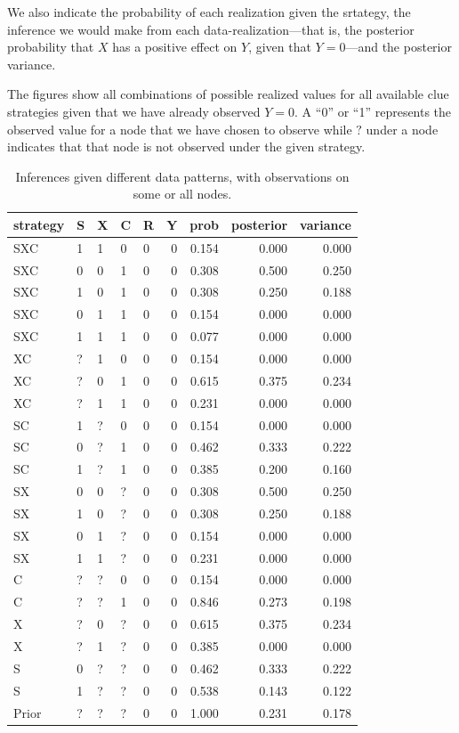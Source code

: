 \documentclass[
  12pt,
]{book}
\begin{document}
We also indicate the probability of each realization given the srtategy, the inference we would make from each data-realization---that is, the posterior probability that \(X\) has a positive effect on \(Y\), given that \(Y=0\)---and the posterior variance.

The figures show all combinations of possible realized values for all available clue strategies given that we have already observed \(Y=0\). A ``0'' or ``1'' represents the observed value for a node that we have chosen to observe while \(?\) under a node indicates that that node is not observed under the given strategy.

\begin{table}

\caption{\label{tab:showstrats5xx}Inferences given different data patterns, with observations on some or all nodes.}
\centering
\begin{tabular}[t]{l|l|l|l|l|r|r|r|r}
\hline
strategy & S & X & C & R & Y & prob & posterior & variance\\
\hline
SXC & 1 & 1 & 0 & 0 & 0 & 0.154 & 0.000 & 0.000\\
\hline
SXC & 0 & 0 & 1 & 0 & 0 & 0.308 & 0.500 & 0.250\\
\hline
SXC & 1 & 0 & 1 & 0 & 0 & 0.308 & 0.250 & 0.188\\
\hline
SXC & 0 & 1 & 1 & 0 & 0 & 0.154 & 0.000 & 0.000\\
\hline
SXC & 1 & 1 & 1 & 0 & 0 & 0.077 & 0.000 & 0.000\\
\hline
XC & ? & 1 & 0 & 0 & 0 & 0.154 & 0.000 & 0.000\\
\hline
XC & ? & 0 & 1 & 0 & 0 & 0.615 & 0.375 & 0.234\\
\hline
XC & ? & 1 & 1 & 0 & 0 & 0.231 & 0.000 & 0.000\\
\hline
SC & 1 & ? & 0 & 0 & 0 & 0.154 & 0.000 & 0.000\\
\hline
SC & 0 & ? & 1 & 0 & 0 & 0.462 & 0.333 & 0.222\\
\hline
SC & 1 & ? & 1 & 0 & 0 & 0.385 & 0.200 & 0.160\\
\hline
SX & 0 & 0 & ? & 0 & 0 & 0.308 & 0.500 & 0.250\\
\hline
SX & 1 & 0 & ? & 0 & 0 & 0.308 & 0.250 & 0.188\\
\hline
SX & 0 & 1 & ? & 0 & 0 & 0.154 & 0.000 & 0.000\\
\hline
SX & 1 & 1 & ? & 0 & 0 & 0.231 & 0.000 & 0.000\\
\hline
C & ? & ? & 0 & 0 & 0 & 0.154 & 0.000 & 0.000\\
\hline
C & ? & ? & 1 & 0 & 0 & 0.846 & 0.273 & 0.198\\
\hline
X & ? & 0 & ? & 0 & 0 & 0.615 & 0.375 & 0.234\\
\hline
X & ? & 1 & ? & 0 & 0 & 0.385 & 0.000 & 0.000\\
\hline
S & 0 & ? & ? & 0 & 0 & 0.462 & 0.333 & 0.222\\
\hline
S & 1 & ? & ? & 0 & 0 & 0.538 & 0.143 & 0.122\\
\hline
Prior & ? & ? & ? & 0 & 0 & 1.000 & 0.231 & 0.178\\
\hline
\end{tabular}
\end{table}
\end{document}
